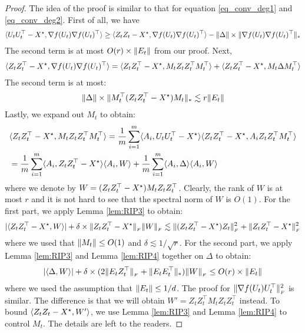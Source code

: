 	\begin{proof}
		The idea of the proof is similar to that for equation \eqref{eq_conv_deg1} and \eqref{eq_conv_deg2}. First of all, we have
		\begin{align*}
			\langle U_tU_t^{\top} - {X}^\star, \nabla f(U_t) \nabla f(U_t)^{\top}\rangle
			\ge \langle Z_t Z_t - {X}^\star, \nabla f(U_t) \nabla f(U_t)^{\top}\rangle
			- \|\Delta\| \times \|\nabla f(U_t)\nabla f(U_t)^{\top}\|_{*}
		\end{align*}
		The second term is at most $O(r) \times \|E_t\|$ from our proof.
		Next,
		\begin{align*}
			\langle Z_tZ_t^{\top} - {X}^\star, \nabla f(U_t) \nabla f(U_t)^{\top}\rangle
			= \langle Z_tZ_t^{\top} - {X}^\star, M_t Z_tZ_t^{\top} M_t^{\top}\rangle
			+ \langle Z_tZ_t^{\top} - {X}^\star, M_t \Delta M_t^{\top}\rangle
		\end{align*}
		The second term is at most:
		\begin{align*}
			\|\Delta\| \times \|M_t^{\top} (Z_tZ_t^{\top} - {X}^\star) M_t\|_{*}
			\lesssim r \|E_t\|
		\end{align*}
		Lastly, we expand out $M_t$ to obtain:
		\begin{align*}
			& \langle Z_tZ_t^{\top} - {X}^\star, M_t Z_tZ_t^{\top} M_t^{\top}\rangle
			= \frac 1 m \sum_{i=1}^m \langle A_i, U_tU_t^{\top} - {X}^\star\rangle \langle Z_tZ_t^{\top} - {X}^\star, A_iZ_tZ_t^{\top}M_t^{\top}\rangle \\
			& = \frac 1 m \sum_{i=1}^m \langle A_i, Z_tZ_t^{\top} - {X}^\star\rangle \langle A_i, W\rangle + \frac 1 m \sum_{i=1}^m \langle A_i, \Delta\rangle \langle A_i, W\rangle
		\end{align*}
		where we denote by $W = (Z_tZ_t^{\top} - {X}^\star)M_tZ_tZ_t^{\top}$.
		Clearly, the rank of $W$ is at most $r$ and it is not hard to see that the spectral norm of $W$ is $O(1)$.
		For the first part, we apply Lemma \ref{lem:RIP3} to obtain:
		\begin{align}
			|\langle Z_tZ_t^{\top} - {X}^\star, W\rangle| + \delta \times \|Z_tZ_t^{\top} - {X}^\star\|_{_{F}} \|W\|_{_{F}}
			\lesssim \|(Z_tZ_t^{\top} - {X}^\star)Z_t\|_{_{F}}^2 + \|Z_tZ_t^{\top} - {X}^\star\|_{_{F}}^2 \label{eq_conv_asym}
		\end{align}
		where we used that $\|M_t\| \le O(1)$ and $\delta \lesssim 1 / \sqrt r$.
		For the second part, we apply Lemma \ref{lem:RIP3} and Lemma \ref{lem:RIP4} together on $\Delta$ to obtain:
		\begin{align*}
			|\langle\Delta, W\rangle| + \delta \times (2\|E_tZ_t^{\top}\|_{_{F}} + \|E_tE_t^{\top}\|_{*}) \|W\|_{_{F}}
			\le O(r) \times \|E_t\|
		\end{align*}
		where we used the assumption that $\|E_t\| \le 1 /d$.
		The proof for $\|\nabla f(U_t)U_t^{\top}\|_{_{F}}^2$ is similar.
		The difference is that we will obtain $W' = Z_tZ_t^{\top} M_t Z_tZ_t^{\top}$ instead.
		To bound $\langle Z_tZ_t - {X}^\star, W'\rangle$, we use Lemma \ref{lem:RIP3} and Lemma \ref{lem:RIP4} to control $M_t$. The details are left to the readers.
	\end{proof}
